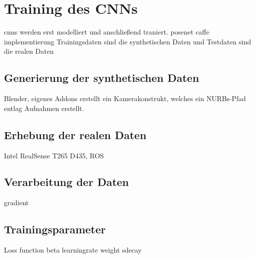 
\section{Training des CNNs}
cnns werden erst modelliert und anschließend traniert.
posenet caffe implementierung
Trainingsdaten sind die synthetischen Daten und Testdaten sind die realen Daten


\subsection{Generierung der synthetischen Daten}
Blender,
eigenes Addons erstellt ein Kamerakonstrukt, welches ein NURBs-Pfad entlag Aufnahmen erstellt.

\subsection{Erhebung der realen Daten}
Intel RealSense T265 D435, ROS

\subsection{Verarbeitung der Daten}
gradient

\subsection{Trainingsparameter}

Loss function beta
learningrate
weight sdecay